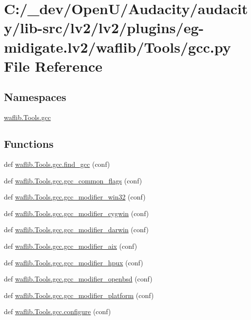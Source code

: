 \hypertarget{lv2_2plugins_2eg-midigate_8lv2_2waflib_2_tools_2gcc_8py}{}\section{C\+:/\+\_\+dev/\+Open\+U/\+Audacity/audacity/lib-\/src/lv2/lv2/plugins/eg-\/midigate.lv2/waflib/\+Tools/gcc.py File Reference}
\label{lv2_2plugins_2eg-midigate_8lv2_2waflib_2_tools_2gcc_8py}
\subsection*{Namespaces}
\begin{DoxyCompactItemize}
\item 
 \hyperlink{namespacewaflib_1_1_tools_1_1gcc}{waflib.\+Tools.\+gcc}
\end{DoxyCompactItemize}
\subsection*{Functions}
\begin{DoxyCompactItemize}
\item 
def \hyperlink{namespacewaflib_1_1_tools_1_1gcc_adf21017012efdee616642ded5bb60683}{waflib.\+Tools.\+gcc.\+find\+\_\+gcc} (conf)
\item 
def \hyperlink{namespacewaflib_1_1_tools_1_1gcc_aa246ce31be40dc13e4667dccc88c659c}{waflib.\+Tools.\+gcc.\+gcc\+\_\+common\+\_\+flags} (conf)
\item 
def \hyperlink{namespacewaflib_1_1_tools_1_1gcc_ae9e66bb9518233bc92bb4dba88559396}{waflib.\+Tools.\+gcc.\+gcc\+\_\+modifier\+\_\+win32} (conf)
\item 
def \hyperlink{namespacewaflib_1_1_tools_1_1gcc_a5a86b1286220845f0499fde5bfd3276d}{waflib.\+Tools.\+gcc.\+gcc\+\_\+modifier\+\_\+cygwin} (conf)
\item 
def \hyperlink{namespacewaflib_1_1_tools_1_1gcc_a1bd8f384e014d4230087830a15403045}{waflib.\+Tools.\+gcc.\+gcc\+\_\+modifier\+\_\+darwin} (conf)
\item 
def \hyperlink{namespacewaflib_1_1_tools_1_1gcc_aaa265ca0c341d3de2b08c63f42ae800b}{waflib.\+Tools.\+gcc.\+gcc\+\_\+modifier\+\_\+aix} (conf)
\item 
def \hyperlink{namespacewaflib_1_1_tools_1_1gcc_aa4d75e5242d8ccd3cf9953b2ac22b0c2}{waflib.\+Tools.\+gcc.\+gcc\+\_\+modifier\+\_\+hpux} (conf)
\item 
def \hyperlink{namespacewaflib_1_1_tools_1_1gcc_a8dadf5c5d5221a13562c2fa8dab9a5cc}{waflib.\+Tools.\+gcc.\+gcc\+\_\+modifier\+\_\+openbsd} (conf)
\item 
def \hyperlink{namespacewaflib_1_1_tools_1_1gcc_a8b495579108d27d3a2ba7efe6fb32489}{waflib.\+Tools.\+gcc.\+gcc\+\_\+modifier\+\_\+platform} (conf)
\item 
def \hyperlink{namespacewaflib_1_1_tools_1_1gcc_abbff880dc3450c1e8e3ecebbd8eebbad}{waflib.\+Tools.\+gcc.\+configure} (conf)
\end{DoxyCompactItemize}
